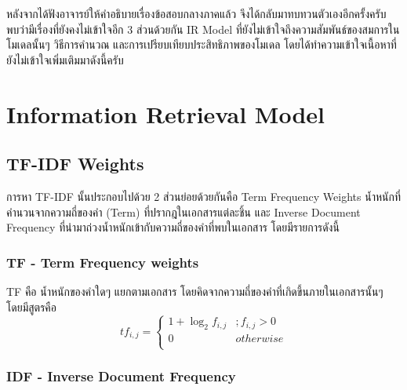 \documentclass[11pt,a4paper]{article}
\begin{document}
หลังจากได้ฟังอาจารย์ให้คำอธิบายเรื่องข้อสอบกลางภาคแล้ว จึงได้กลับมาทบทวนตัวเองอีกครั้งครับ พบว่ามีเรื่องที่ยังคงไม่เข้าใจอีก 3 ส่วนด้วยกัน IR Model ที่ยังไม่เข้าใจถึงความสัมพันธ์ของสมการในโมเดลนั้นๆ วิธีการคำนวณ และการเปรียบเทียบประสิทธิภาพของโมเดล โดยได้ทำความเข้าใจเนื้อหาที่ยังไม่เข้าใจเพิ่มเติมมาดังนี้ครับ

\section{Information Retrieval Model}

\subsection{TF-IDF Weights}

การหา TF-IDF นั้นประกอบไปด้วย 2 ส่วนย่อยด้วยกันคือ Term Frequency Weights น้ำหนักที่คำนวนจากความถี่ของคำ (Term) ที่ปรากฎในเอกสารแต่ละชิ้น และ Inverse Document Frequency ที่นำมาถ่วงน้ำหนักเข้ากับความถี่ของคำที่พบในเอกสาร โดยมีรายการดังนี้

\subsubsection{TF - Term Frequency weights}

TF คือ น้ำหนักของคำใดๆ แยกตามเอกสาร โดยคิดจากความถี่ของคำที่เกิดขึ้นภายในเอกสารนั้นๆ โดยมีสูตรคือ
\begin{equation}
    \label{eq:tf}
    tf_{i,j} = 
    \begin{cases}
        1 + \log_2{f_{i,j}} &;  f_{i,j} > 0 \\
        0 & otherwise \\
    \end{cases}
\end{equation}

\subsubsection{IDF - Inverse Document Frequency}
\end{document}

